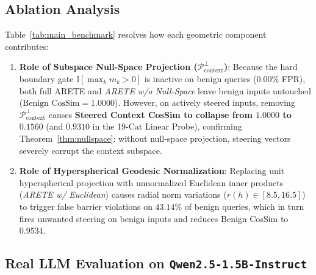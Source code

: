 \documentclass[11pt,twocolumn,a4paper]{article}
\begin{document}
\subsection{Ablation Analysis}
\label{sec:ablations}
Table~\ref{tab:main_benchmark} resolves how each geometric component contributes:
\begin{enumerate}[leftmargin=*,nosep]
    \item \textbf{Role of Subspace Null-Space Projection ($\mathcal{P}_{\text{context}}^\perp$)}: Because the hard boundary gate $\mathbb{I}[\max_k m_k > 0]$ is inactive on benign queries ($0.00\%$ FPR), both full ARETE and \textit{ARETE w/o Null-Space} leave benign inputs untouched ($\text{Benign CosSim} = 1.0000$). However, on actively steered inputs, removing $\mathcal{P}_{\text{context}}^\perp$ causes \textbf{Steered Context CosSim to collapse from $1.0000$ to $0.1560$} (and $0.9310$ in the 19-Cat Linear Probe), confirming Theorem~\ref{thm:nullspace}: without null-space projection, steering vectors severely corrupt the context subspace.
    \item \textbf{Role of Hyperspherical Geodesic Normalization}: Replacing unit hyperspherical projection with unnormalized Euclidean inner products (\textit{ARETE w/ Euclidean}) causes radial norm variations ($r(h) \in [8.5, 16.5]$) to trigger false barrier violations on $43.14\%$ of benign queries, which in turn fires unwanted steering on benign inputs and reduces Benign CosSim to $0.9534$.
\end{enumerate}

\subsection{Real LLM Evaluation on \texttt{Qwen2.5-1.5B-Instruct}}
\label{sec:qwen_eval}
\end{document}
